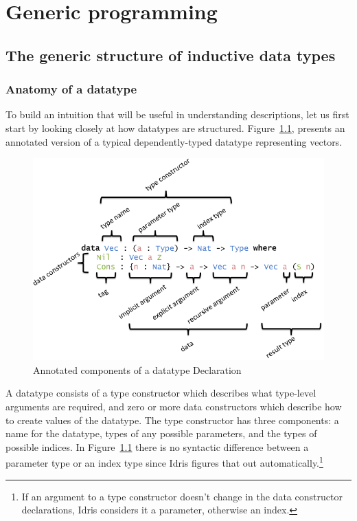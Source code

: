 \documentclass{ituthesis}
\theoremstyle{definition}
\begin{document}
\chapter{Generic programming}
\label{cha:GenericProgramming}
\section{The generic structure of inductive data types}
\label{sec:TheGenericStructureofInductiveDataTypes}
\subsection{Anatomy of a datatype}
\label{sub:AnatomyofaDatatype}
To build an intuition that will be useful in understanding descriptions, let us first start by looking closely at how datatypes are structured.
Figure~\ref{fig:anatomydatatype}, presents an annotated version of a typical dependently-typed datatype representing vectors.

\begin{figure}[ht]
\begin{center}
    \includegraphics[scale=0.5]{Figures/AnatomyOfADatatype.png}
\end{center}
\caption{Annotated components of a datatype Declaration}
\label{fig:anatomydatatype}
\end{figure}

A datatype consists of a type constructor which describes what type-level arguments are required, and zero or more data constructors which describe how to create values of the datatype.
The type constructor has three components: a name for the datatype, types of any possible parameters, and the types of possible indices.
In Figure~\ref{fig:anatomydatatype} there is no syntactic difference between a parameter type or an index type since Idris figures that out automatically.\footnote{If an argument to a type constructor doesn't change in the data constructor declarations, Idris considers it a parameter, otherwise an index.}
\end{document}
